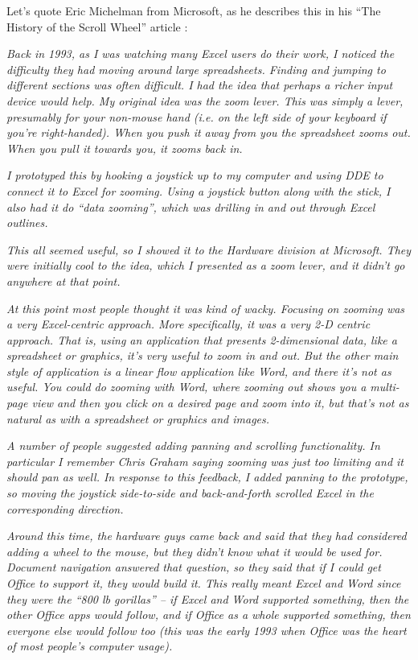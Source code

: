 \documentclass[11pt, a4paper]{article}
\begin{document}
Let's quote Eric Michelman from Microsoft, as he describes this in his “The History of the Scroll Wheel” article \cite{ink}:

\textit{Back in 1993, as I was watching many Excel users do their work, I noticed the difficulty they had moving around large spreadsheets. Finding and jumping to different sections was often difficult. I had the idea that perhaps a richer input device would help.
My original idea was the zoom lever. This was simply a lever, presumably for your non-mouse hand (i.e. on the left side of your keyboard if you're right-handed). When you push it away from you the spreadsheet zooms out. When you pull it towards you, it zooms back in.}

\textit{I prototyped this by hooking a joystick up to my computer and using DDE to connect it to Excel for zooming. Using a joystick button along with the stick, I also had it do “data zooming”, which was drilling in and out through Excel outlines.}

\textit{This all seemed useful, so I showed it to the Hardware division at Microsoft. They were initially cool to the idea, which I presented as a zoom lever, and it didn't go anywhere at that point.}

\textit{At this point most people thought it was kind of wacky. Focusing on zooming was a very Excel-centric approach. More specifically, it was a very 2-D centric approach. That is, using an application that presents 2-dimensional data, like a spreadsheet or graphics, it's very useful to zoom in and out. But the other main style of application is a linear flow application like Word, and there it's not as useful. You could do zooming with Word, where zooming out shows you a multi-page view and then you click on a desired page and zoom into it, but that's not as natural as with a spreadsheet or graphics and images.}

\textit{A number of people suggested adding panning and scrolling functionality. In particular I remember Chris Graham saying zooming was just too limiting and it should pan as well. In response to this feedback, I added panning to the prototype, so moving the joystick side-to-side and back-and-forth scrolled Excel in the corresponding direction.}

\textit{Around this time, the hardware guys came back and said that they had considered adding a wheel to the mouse, but they didn't know what it would be used for. Document navigation answered that question, so they said that if I could get Office to support it, they would build it. This really meant Excel and Word since they were the “800 lb gorillas” -- if Excel and Word supported something, then the other Office apps would follow, and if Office as a whole supported something, then everyone else would follow too (this was the early 1993 when Office was the heart of most people's computer usage).}
\end{document}
